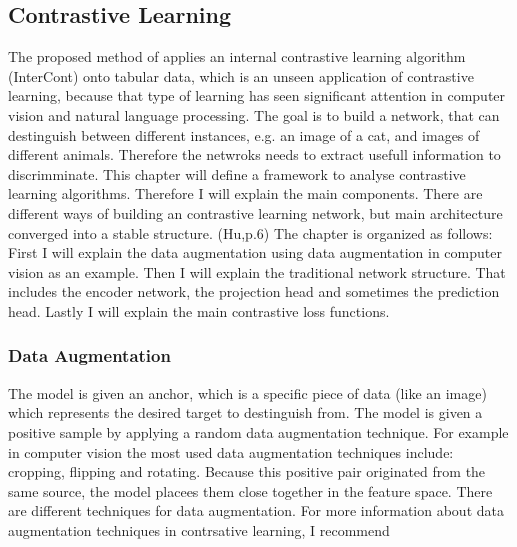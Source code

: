 \subsection{Contrastive Learning}
The proposed method of \citet{shenkar2022anomaly} applies an internal contrastive learning algorithm (InterCont) onto tabular data, which is an unseen application of contrastive learning, 
because that type of learning has seen significant attention in computer vision and natural language processing.
The goal is to build a network, that can destinguish between different instances, e.g. an image of a cat, and images of different animals. 
Therefore the netwroks needs to extract usefull information to discrimminate.
This chapter will define a framework to analyse contrastive learning algorithms. 
Therefore I will explain the main components. 
There are different ways of building an contrastive learning network, but main architecture converged into a stable structure. (Hu,p.6)
The chapter is organized as follows: First I will explain the data augmentation using data augmentation in computer vision as an example.
Then I will explain the traditional network structure.
That includes the encoder network, the projection head and sometimes the prediction head.
Lastly I will explain the main contrastive loss functions.


\subsubsection*{Data Augmentation}
The model is given an anchor, which is a specific piece of data (like an image) which represents the desired target to destinguish from. 
The model is given a positive sample by applying a random data augmentation technique.
For example in computer vision the most used data augmentation techniques include: cropping, flipping and rotating. 
Because this positive pair originated from the same source, the model placees them close together in the feature space.
There are different techniques for data augmentation.
For more information about data augmentation techniques in contrsative learning, I recommend 


